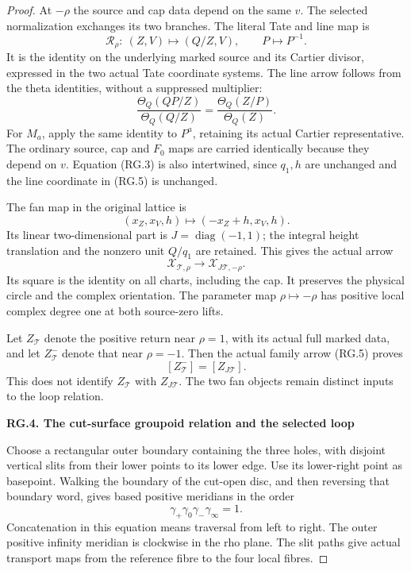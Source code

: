 \begin{proof}
At \(-\rho\) the source and cap data depend on the same \(v\).
The selected normalization exchanges its two branches. The
literal Tate and line map is
\[
 \mathcal R_\rho:\ (Z,V)\longmapsto(Q/Z,V),
 \qquad P\longmapsto P^{-1}.                          \tag{RG.5}
\]
It is the identity on the underlying marked source and its
Cartier divisor, expressed in the two actual Tate coordinate
systems. The line arrow follows from the theta identities,
without a suppressed multiplier:
\[
 \frac{\Theta_Q(QP/Z)}{\Theta_Q(Q/Z)}
       =\frac{\Theta_Q(Z/P)}{\Theta_Q(Z)}.
\]
For \(M_a\), apply the same identity to \(P^a\), retaining its
actual Cartier representative. The ordinary source, cap and
\(F_0\) maps are carried identically because they depend on
\(v\). Equation (RG.3) is also intertwined, since \(q_1,h\) are
unchanged and the line coordinate in (RG.5) is unchanged.

The fan map in the original lattice is
\[
 (x_Z,x_V,h)\longmapsto(-x_Z+h,x_V,h).
\]
Its linear two-dimensional part is
\(J=\operatorname{diag}(-1,1)\); the integral height translation
and the nonzero unit \(Q/q_1\) are retained. This gives the
actual arrow
\[
 \mathcal X_{\mathcal T,\rho}\longrightarrow
             \mathcal X_{J\mathcal T,-\rho}.
\]
Its square is the identity on all charts, including the cap.
It preserves the physical circle and the complex orientation.
The parameter map \(\rho\mapsto-\rho\) has positive local
complex degree one at both source-zero lifts.

Let \(Z_{\mathcal T}\) denote the positive return near
\(\rho=1\), with its actual full marked data, and let
\(Z^-_{\mathcal T}\) denote that near \(\rho=-1\). Then the
actual family arrow (RG.5) proves
\[
                  [Z^-_{\mathcal T}]=[Z_{J\mathcal T}]. \tag{RG.6}
\]
This does not identify \(Z_{\mathcal T}\) with
\(Z_{J\mathcal T}\). The two fan objects remain distinct inputs
to the loop relation.

\par

\medskip\noindent\textbf{RG.4. The cut-surface groupoid relation and the selected loop}

\par\nobreak

Choose a rectangular outer boundary containing the three holes,
with disjoint vertical slits from their lower points to its
lower edge. Use its lower-right point as basepoint. Walking the
boundary of the cut-open disc, and then reversing that boundary
word, gives based positive meridians in the order
\[
             \gamma_+\gamma_0\gamma_-\gamma_\infty=1. \tag{RG.7}
\]
Concatenation in this equation means traversal from left to
right. The outer positive infinity meridian is clockwise in
the rho plane. The slit paths give actual transport maps from
the reference fibre to the four local fibres.


\end{proof}

